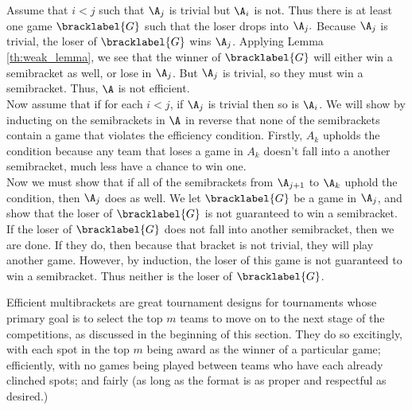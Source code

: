 {{        Assume that $i < j$ such that $\A_j$ is trivial but $\A_i$ is not. Thus there is at least one game $\bracklabel{G}$ such that the loser drops into $\A_j.$ Because $\A_j$ is trivial, the loser of $\bracklabel{G}$ wins $\A_j$. Applying Lemma \ref{th:weak_lemma}, we see that the winner of $\bracklabel{G}$ will either win a semibracket as well, or lose in $\A_j$. But $\A_j$ is trivial, so they must win a semibracket. Thus, $\A$ is not efficient.\\

        Now assume that if for each $i < j$, if $\A_j$ is trivial then so is $\A_i$. We will show by inducting on the semibrackets in $\A$ in reverse that none of the semibrackets contain a game that violates the efficiency condition. Firstly, $A_k$ upholds the condition because any team that loses a game in $A_k$ doesn't fall into a another semibracket, much less have a chance to win one.\\
        
        Now we must show that if all of the semibrackets from $\A_{j+1}$ to $\A_k$ uphold the condition, then $\A_j$ does as well. We let $\bracklabel{G}$ be a game in $\A_j$, and show that the loser of $\bracklabel{G}$ is not guaranteed to win a semibracket. If the loser of $\bracklabel{G}$ does not fall into another semibracket, then we are done. If they do, then because that bracket is not trivial, they will play another game. However, by induction, the loser of this game is not guaranteed to win a semibracket. Thus neither is the loser of $\bracklabel{G}$.
    }{}

    Efficient multibrackets are great tournament designs for tournaments whose primary goal is to select the top $m$ teams to move on to the next stage of the competitions, as discussed in the beginning of this section. They do so excitingly, with each spot in the top $m$ being award as the winner of a particular game; efficiently, with no games being played between teams who have each already clinched spots; and fairly (as long as the format is as proper and respectful as desired.)
}